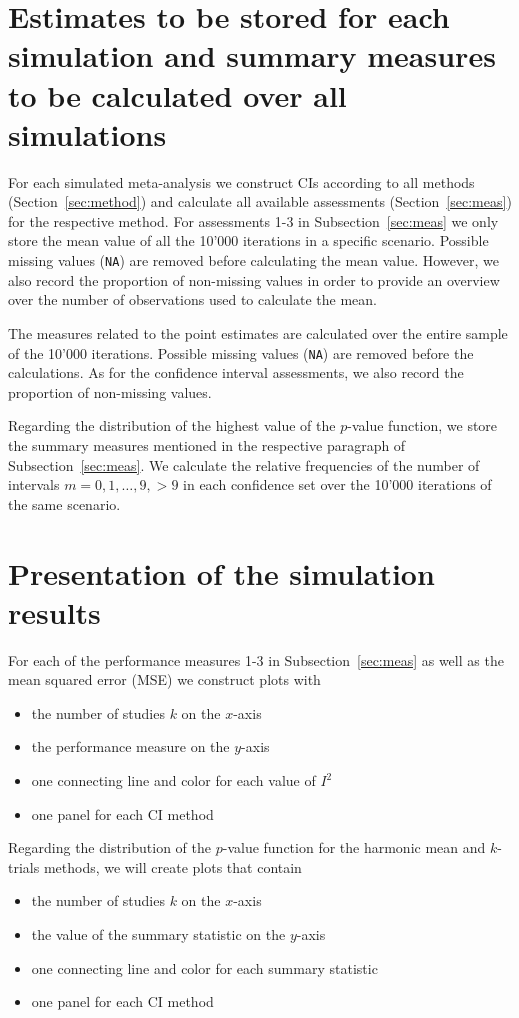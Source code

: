 \documentclass[letterpaper, 12pt]{article}
\begin{document}
\section{
  Estimates to be stored for each simulation and summary measures to
  be calculated over all simulations
}
For each simulated meta-analysis we construct CIs according to all methods
(Section~\ref{sec:method}) and calculate all available assessments
(Section~\ref{sec:meas}) for the respective method. For assessments 1-3 in
Subsection~\ref{sec:meas} we only store the mean value of all the 10'000
iterations in a specific scenario. Possible missing values (\texttt{NA})
are removed before calculating the mean value. However, we also record the
proportion of non-missing values in order to provide an overview over the number
of observations used to calculate the mean.

The measures related to the point estimates are calculated over the entire
sample of the 10'000 iterations. Possible missing values (\texttt{NA}) are
removed before the calculations. As for the confidence interval assessments, we
also record the proportion of non-missing values.

Regarding the distribution of the
highest value of the $p$-value function, we store the summary measures mentioned
in the respective paragraph of Subsection~\ref{sec:meas}. We calculate the
relative frequencies of the number of intervals $m=0, 1, \ldots, 9, >9$ in each
confidence set over the 10'000 iterations of the same scenario.

\section{Presentation of the simulation results}
For each of the performance measures 1-3 in Subsection~\ref{sec:meas} as well as
the mean squared error (MSE) we construct plots with

\begin{itemize}
\item the number of studies $k$ on the $x$-axis
\item the performance measure on the $y$-axis
\item one connecting line and color for each value of $I^2$
\item one panel for each CI method
\end{itemize}

Regarding the distribution of the $p$-value function for the harmonic mean
and $k$-trials methods, we will create plots that contain
\begin{itemize}
\item the number of studies $k$ on the $x$-axis
\item the value of the summary statistic on the $y$-axis
\item one connecting line and color for each summary statistic
\item one panel for each CI method
\end{itemize}
\end{document}
